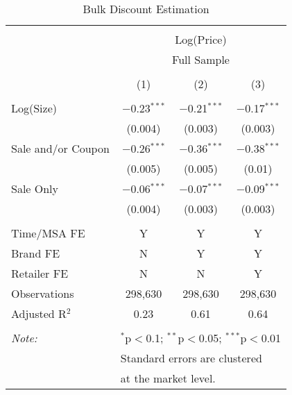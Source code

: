 
\begin{table}[!htbp] \centering 
  \caption{Bulk Discount Estimation} 
  \label{tab:bulkDiscountSale} 
\begin{tabular}{@{\extracolsep{5pt}}lccc} 
\\[-1.8ex]\hline 
\hline \\[-1.8ex] 
 & \multicolumn{3}{c}{Log(Price)} \\ 
\cline{2-4} 
 & \multicolumn{3}{c}{Full Sample} \\ 
\\[-1.8ex] & (1) & (2) & (3)\\ 
\hline \\[-1.8ex] 
 Log(Size) & $-$0.23$^{***}$ & $-$0.21$^{***}$ & $-$0.17$^{***}$ \\ 
  & (0.004) & (0.003) & (0.003) \\ 
  Sale and/or Coupon & $-$0.26$^{***}$ & $-$0.36$^{***}$ & $-$0.38$^{***}$ \\ 
  & (0.005) & (0.005) & (0.01) \\ 
  Sale Only & $-$0.06$^{***}$ & $-$0.07$^{***}$ & $-$0.09$^{***}$ \\ 
  & (0.004) & (0.003) & (0.003) \\ 
 \hline \\[-1.8ex] 
Time/MSA FE & Y & Y & Y \\ 
Brand FE & N & Y & Y \\ 
Retailer FE & N & N & Y \\ 
Observations & 298,630 & 298,630 & 298,630 \\ 
Adjusted R$^{2}$ & 0.23 & 0.61 & 0.64 \\ 
\hline 
\hline \\[-1.8ex] 
\textit{Note:}  & \multicolumn{3}{l}{$^{*}$p$<$0.1; $^{**}$p$<$0.05; $^{***}$p$<$0.01} \\ 
 & \multicolumn{3}{l}{Standard errors are clustered } \\ 
 & \multicolumn{3}{l}{at the market level.} \\ 
\end{tabular} 
\end{table} 
